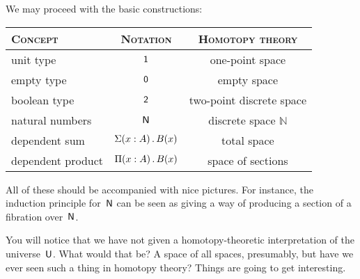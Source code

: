 \documentclass{article}
\begin{document}
We may proceed with the basic constructions:
%
\begin{center}
\begin{tabular}{lcc}
  \toprule
  \textsc{Concept} & \textsc{Notation} & \textsc{Homotopy theory} \\
  \midrule
  unit type        & $\mathsf{1}$    & one-point space \\
  empty type       & $\mathsf{0}$   & empty space \\
  boolean type     & $\mathsf{2}$   & two-point discrete space \\
  natural numbers  & $\mathsf{N}$     & discrete space $\mathbb{N}$ \\
  dependent sum    & $\Sigma(x : A) \,.\, B(x)$ & total space \\
  dependent product & $\Pi(x : A) \,.\, B(x)$ & space of sections \\
  \bottomrule
\end{tabular}
\end{center}
%
All of these should be accompanied with nice pictures. For instance, the
induction principle for~$\mathsf{N}$ can be seen as giving a way of producing a
section of a fibration over~$\mathsf{N}$.

You will notice that we have not given a homotopy-theoretic interpretation of
the universe~$\mathsf{U}$. What would that be? A space of all spaces, presumably, but
have we ever seen such a thing in homotopy theory? Things are going to get
interesting.



\end{document}
